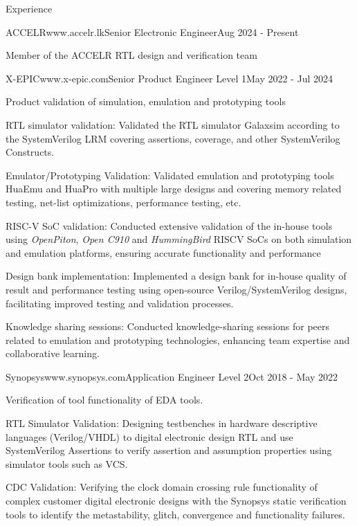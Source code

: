\documentclass[
11pt, %
]{./assets/resume} %
\begin{document}
\begin{rSection}{Experience}
	\begin{rSubsectionX}{ACCELR}{www.accelr.lk}{Senior Electronic Engineer}{Aug 2024 - Present}
		\item Member of the ACCELR RTL design and verification team
	\end{rSubsectionX}
	\begin{rSubsectionX}{X-EPIC}{www.x-epic.com}{Senior Product Engineer Level 1}{May 2022 - Jul 2024}
		\item Product validation of simulation, emulation and prototyping tools 
		\item RTL simulator validation: Validated the RTL simulator Galaxsim according to the SystemVerilog LRM covering assertions, coverage, and other SystemVerilog Constructs. 
		\item Emulator/Prototyping Validation: Validated emulation and prototyping tools HuaEmu and HuaPro with multiple large designs and covering memory related testing, net-list optimizations, performance testing, etc. 
		\item RISC-V SoC validation: Conducted extensive validation of the in-house tools using \textit{OpenPiton}, \textit{Open C910} and \textit{HummingBird} RISCV SoCs on both simulation and emulation platforms, ensuring accurate functionality and performance 
		\item Design bank implementation: Implemented a design bank for in-house quality of result and performance testing using open-source Verilog/SystemVerilog designs, facilitating improved testing and validation processes. 
		\item Knowledge sharing sessions: Conducted knowledge-sharing sessions for peers related to emulation and prototyping technologies, enhancing team expertise and collaborative learning.
	\end{rSubsectionX}
	\begin{rSubsectionX}{Synopsys}{www.synopsys.com}{Application Engineer Level 2}{Oct 2018 - May 2022}
		\item Verification of tool functionality of EDA tools.
		\item RTL Simulator Validation: Designing testbenches in hardware descriptive languages (Verilog/VHDL) to digital electronic design RTL and use SystemVerilog Assertions to verify assertion and assumption properties using simulator tools such as VCS. 
		\item CDC Validation: Verifying the clock domain crossing rule functionality of complex customer digital electronic designs with the Synopsys static verification tools to identify the metastability, glitch, convergence and functionality failures. 

\end{rSubsectionX}
\end{rSection}
\end{document}
